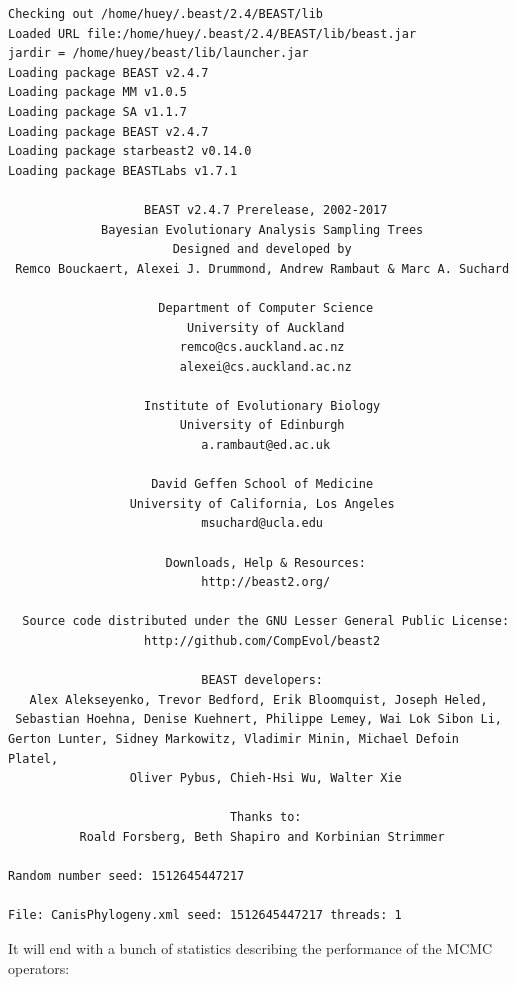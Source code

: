 \documentclass[12pt]{article}
\begin{document}
\begin{verbatim}Checking out /home/huey/.beast/2.4/BEAST/lib
Loaded URL file:/home/huey/.beast/2.4/BEAST/lib/beast.jar
jardir = /home/huey/beast/lib/launcher.jar
Loading package BEAST v2.4.7
Loading package MM v1.0.5
Loading package SA v1.1.7
Loading package BEAST v2.4.7
Loading package starbeast2 v0.14.0
Loading package BEASTLabs v1.7.1

                   BEAST v2.4.7 Prerelease, 2002-2017
             Bayesian Evolutionary Analysis Sampling Trees
                       Designed and developed by
 Remco Bouckaert, Alexei J. Drummond, Andrew Rambaut & Marc A. Suchard
                                    
                     Department of Computer Science
                         University of Auckland
                        remco@cs.auckland.ac.nz
                        alexei@cs.auckland.ac.nz
                                    
                   Institute of Evolutionary Biology
                        University of Edinburgh
                           a.rambaut@ed.ac.uk
                                    
                    David Geffen School of Medicine
                 University of California, Los Angeles
                           msuchard@ucla.edu
                                    
                      Downloads, Help & Resources:
                           http://beast2.org/
                                    
  Source code distributed under the GNU Lesser General Public License:
                   http://github.com/CompEvol/beast2
                                    
                           BEAST developers:
   Alex Alekseyenko, Trevor Bedford, Erik Bloomquist, Joseph Heled, 
 Sebastian Hoehna, Denise Kuehnert, Philippe Lemey, Wai Lok Sibon Li, 
Gerton Lunter, Sidney Markowitz, Vladimir Minin, Michael Defoin Platel, 
                 Oliver Pybus, Chieh-Hsi Wu, Walter Xie
                                    
                               Thanks to:
          Roald Forsberg, Beth Shapiro and Korbinian Strimmer

Random number seed: 1512645447217

File: CanisPhylogeny.xml seed: 1512645447217 threads: 1\end{verbatim}

It will end with a bunch of statistics describing the performance of the MCMC operators:
\end{document}
